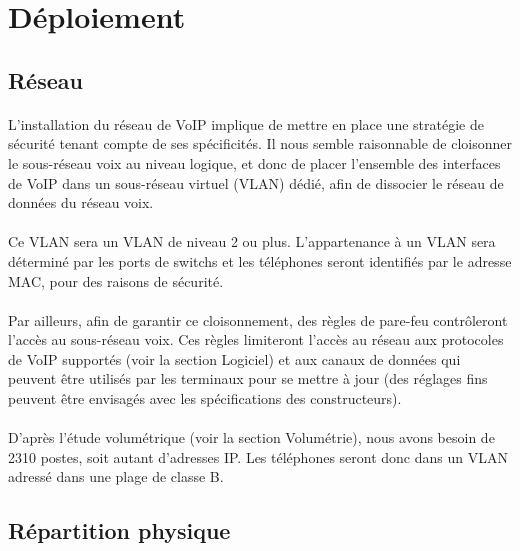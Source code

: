 \section{Déploiement}

\subsection{Réseau}

\paragraph{} L'installation du réseau de VoIP implique de mettre en place une
stratégie de sécurité tenant compte de ses spécificités. Il nous semble
raisonnable de cloisonner le sous-réseau voix au niveau logique, et donc de
placer l'ensemble des interfaces de VoIP dans un sous-réseau virtuel (VLAN)
dédié, afin de dissocier le réseau de données du réseau voix.

\paragraph{} Ce VLAN sera un VLAN de niveau 2 ou plus. L'appartenance à un VLAN
sera déterminé par les ports de switchs et les téléphones seront identifiés par
le adresse MAC, pour des raisons de sécurité.

\paragraph{} Par ailleurs, afin de garantir ce cloisonnement, des règles de
pare-feu contrôleront l'accès au sous-réseau voix. Ces règles limiteront
l'accès au réseau aux protocoles de VoIP supportés (voir la section
Logiciel) et aux canaux de données qui peuvent être utilisés par les
terminaux pour se mettre à jour (des réglages fins peuvent être envisagés avec
les spécifications des constructeurs).

\paragraph{} D'après l'étude volumétrique (voir la section Volumétrie), nous avons
besoin de 2310 postes, soit autant d'adresses IP. Les téléphones seront donc
dans un VLAN adressé dans une plage de classe B.

\subsection{Répartition physique}

